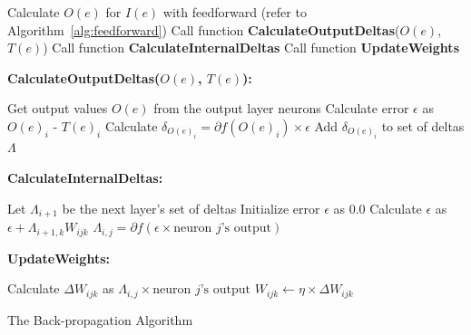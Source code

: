 \documentclass[11pt]{article}
\begin{document}
\begin{algorithm}%
\DontPrintSemicolon
{}

\SetAlgoLined

{
	Calculate $O(e)$ for $I(e)$ with feedforward (refer to Algorithm~\ref{alg:feedforward})\;
	Call function \textbf{CalculateOutputDeltas}($O(e)$, $T(e)$)\;
	Call function \textbf{CalculateInternalDeltas}\;
	Call function \textbf{UpdateWeights}\;
}

\textbf{CalculateOutputDeltas($O(e)$, $T(e)$):}

Get output values $O(e)$ from the output layer neurons\;
{
	Calculate error $\epsilon$ as $O(e)_i$ - $T(e)_i$\;
	Calculate \textbf{$\delta_{O(e)_{i}} = \partial{f(O(e)_{i})}  \times \epsilon $}\;
	Add $\delta_{O(e)_{i}}$ to set of deltas $\Lambda$
}  

\textbf{CalculateInternalDeltas:}

Let $\Lambda_{i+1}$ be the next layer's set of deltas\;
{
	{
	Initialize error $\epsilon$ as $0.0$\;
		{
			Calculate $\epsilon$ as $\epsilon + \Lambda_{i+1,k} W_{ijk}$\;
		}
		$\Lambda_{i,j} = \partial{f( \epsilon \times \mbox{neuron } j\mbox{'s output} )}$\;
	}
} 

\textbf{UpdateWeights:}

{
	{
		{
			Calculate $\Delta W_{ijk}$ as $\Lambda_{i,j} \times \mbox{neuron } j\mbox{'s output}$\;
			$W_{ijk} \leftarrow \eta \times \Delta{W_{ijk}}   $\;
		}
	}
} 

\caption{The Back-propagation Algorithm }
\label{alg:backpropagation}
\end{algorithm}
\end{document}
